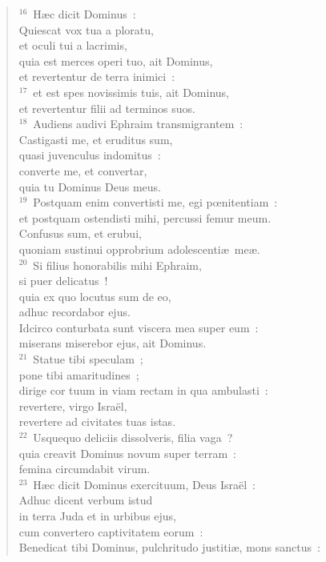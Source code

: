 \begin{flushleft}
\begin{verse}
${}^{16}$~H\ae c dicit Dominus~:\\ Quiescat vox tua a ploratu,\\ et oculi tui a lacrimis,\\ quia est merces operi tuo, ait Dominus,\\ et revertentur de terra inimici~:\\
${}^{17}$~et est spes novissimis tuis, ait Dominus,\\ et revertentur filii ad terminos suos.\\
${}^{18}$~Audiens audivi Ephraim transmigrantem~:\\ Castigasti me, et eruditus sum,\\ quasi juvenculus indomitus~:\\ converte me, et convertar,\\ quia tu Dominus Deus meus.\\
${}^{19}$~Postquam enim convertisti me, egi pœnitentiam~:\\ et postquam ostendisti mihi, percussi femur meum.\\ Confusus sum, et erubui,\\ quoniam sustinui opprobrium adolescenti\ae\ me\ae .\\
${}^{20}$~Si filius honorabilis mihi Ephraim,\\ si puer delicatus~!\\ quia ex quo locutus sum de eo,\\ adhuc recordabor ejus.\\ Idcirco conturbata sunt viscera mea super eum~:\\ miserans miserebor ejus, ait Dominus.\\
${}^{21}$~Statue tibi speculam~;\\ pone tibi amaritudines~;\\ dirige cor tuum in viam rectam in qua ambulasti~:\\ revertere, virgo Isra\"el,\\ revertere ad civitates tuas istas.\\
${}^{22}$~Usquequo deliciis dissolveris, filia vaga~?\\ quia creavit Dominus novum super terram~:\\ femina circumdabit virum.\\
${}^{23}$~H\ae c dicit Dominus exercituum, Deus Isra\"el~:\\ Adhuc dicent verbum istud\\ in terra Juda et in urbibus ejus,\\ cum convertero captivitatem eorum~:\\ Benedicat tibi Dominus, pulchritudo justiti\ae , mons sanctus~:\\

\end{verse}
\end{flushleft}

